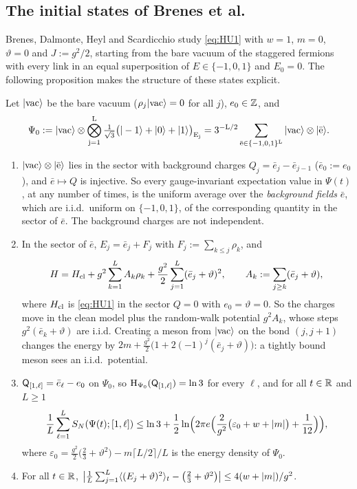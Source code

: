 \subsection{The initial states of Brenes et al.}\label{sec:u1:brenes}

Brenes, Dalmonte, Heyl and Scardicchio \cite{Brenes2018} study \eqref{eq:HU1} with $w=1$, $m=0$, $\vartheta=0$
and $J:=g^2/2$, starting from the bare vacuum of the staggered fermions with every link in an equal superposition of
$E\in\{-1,0,1\}$ and $E_0=0$.  The following proposition makes the structure of these states explicit.

\begin{proposition}\label{prop:brenes}
Let $|\rm vac\rangle$ be the bare vacuum ($\rho_j|\rm vac\rangle=0$ for all $j$), $e_0\in\mathbb{Z}$, and
\[
  \Psi_0:=|\rm vac\rangle\otimes\bigotimes_{j=1}^L\tfrac1{\sqrt3}\bigl(|-1\rangle+|0\rangle+|1\rangle\bigr)_{E_j}
  =3^{-L/2}\sum_{\bar e\in\{-1,0,1\}^L}|\rm vac\rangle\otimes|\bar e\rangle.
\]
\begin{enumerate}[label=(\alph*)]
\item $|\rm vac\rangle\otimes|\bar e\rangle$ lies in the sector with background charges $Q_j=\bar e_j-\bar e_{j-1}$
($\bar e_0:=e_0$), and $\bar e\mapsto Q$ is injective.  So every gauge-invariant expectation value in $\Psi(t)$, at any
number of times, is the uniform average over the \emph{background fields} $\bar e$, which are i.i.d.\ uniform on
$\{-1,0,1\}$, of the corresponding quantity in the sector of $\bar e$.  The background charges are not independent.
\item In the sector of $\bar e$, $E_j=\bar e_j+F_j$ with $F_j:=\sum_{k\le j}\rho_k$, and
\[
  H=H_{\rm cl}+g^2\sum_{k=1}^LA_k\rho_k+\frac{g^2}2\sum_{j=1}^L(\bar e_j+\vartheta)^2,\qquad
  A_k:=\sum_{j\ge k}(\bar e_j+\vartheta),
\]
where $H_{\rm cl}$ is \eqref{eq:HU1} in the sector $Q=0$ with $e_0=\vartheta=0$.  So the charges move in the clean
model plus the random-walk potential $g^2A_k$, whose steps $g^2(\bar e_k+\vartheta)$ are i.i.d.  Creating a meson
from $|\rm vac\rangle$ on the bond $(j,j+1)$ changes the energy by $2m+\frac{g^2}2\bigl(1+2(-1)^j(\bar e_j+\vartheta)\bigr)$:
a tightly bound meson sees an i.i.d.\ potential.
\item $\mathsf{Q}_{[1,\ell]}=\bar e_\ell-e_0$ on $\Psi_0$, so $\mathrm{H}_{\Psi_0}(\mathsf{Q}_{[1,\ell]})=\ln3$ for every $\ell$, and for all
$t\in\mathbb{R}$ and $L\ge1$
\[
  \frac1L\sum_{\ell=1}^LS_{N}(\Psi(t);[1,\ell])\le\ln3+\frac12\ln\Bigl(2\pi e\Bigl(\frac2{g^2}\bigl(\varepsilon_0+w+\left|m\right|\bigr)
  +\frac1{12}\Bigr)\Bigr),
\]
where $\varepsilon_0=\frac{g^2}2\bigl(\frac23+\vartheta^2\bigr)-m\lceil L/2\rceil/L$ is the energy density of $\Psi_0$.
\item For all $t\in\mathbb{R}$,
$\bigl|\frac1L\sum_{j=1}^L\langle(E_j+\vartheta)^2\rangle_t-\bigl(\frac23+\vartheta^2\bigr)\bigr|\le4(w+\left|m\right|)/g^2$.
\end{enumerate}
\end{proposition}


